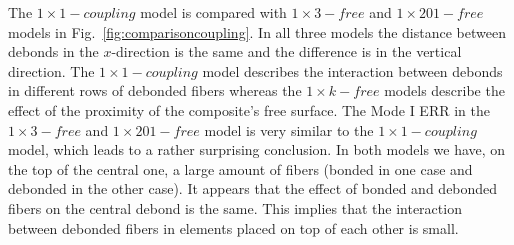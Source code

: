 \documentclass[review]{elsarticle}
\begin{document}
The $1\times 1-coupling$ model is compared with $1\times 3-free$ and $1\times 201-free$ models in Fig.~\ref{fig:comparisoncoupling}. In all three models the distance between debonds in the $x$-direction is the same and the difference is in the vertical direction. The $1\times 1-coupling$ model describes the interaction between debonds in different rows of debonded fibers whereas the $1\times k-free$ models describe the effect of the proximity of the composite's free surface. The Mode I ERR in the $1\times 3-free$ and $1\times 201-free$ model is very similar to the $1\times 1-coupling$ model, which leads to a rather surprising conclusion. In both models we have, on the top of the central one, a large amount of fibers (bonded in one case and debonded in the other case). It appears that the effect of bonded and debonded fibers on the central debond is the same. This implies that the interaction between debonded fibers in elements placed on top of each other is small.
\end{document}
